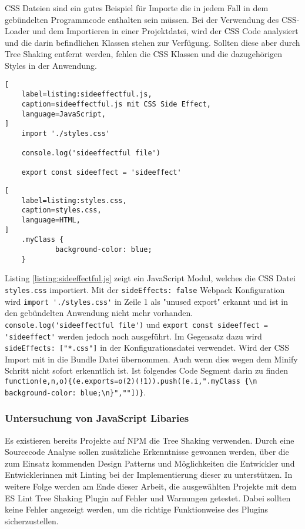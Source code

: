 CSS Dateien sind ein gutes Beispiel für Importe die in jedem Fall in dem gebündelten Programmcode enthalten sein müssen. Bei der Verwendung des CSS-Loader und dem Importieren in einer Projektdatei, wird der CSS Code analysiert und die darin befindlichen Klassen stehen zur Verfügung. Sollten diese aber durch Tree Shaking entfernt werden, fehlen die CSS Klassen und die dazugehörigen Styles in der Anwendung.
\autocite{WebpackTreeShaking}

\begin{lstlisting}[
    label=listing:sideeffectful.js,
	caption=sideeffectful.js mit CSS Side Effect,
	language=JavaScript,
]
	import './styles.css'

	console.log('sideeffectful file')

	export const sideeffect = 'sideeffect'
\end{lstlisting}

\begin{lstlisting}[
    label=listing:styles.css,
	caption=styles.css,
	language=HTML,
]
	.myClass {
    		background-color: blue;
	}
\end{lstlisting}

Listing \ref{listing:sideeffectful.js} zeigt ein JavaScript Modul, welches die CSS Datei \lstinline{styles.css} importiert. Mit der \lstinline{sideEffects: false} Webpack Konfiguration wird \lstinline{import './styles.css'} in Zeile 1 als "unused export" erkannt und ist in den gebündelten Anwendung nicht mehr vorhanden. \lstinline{console.log('sideeffectful file')} und \lstinline{export const sideeffect = 'sideeffect'} werden jedoch noch ausgeführt.
Im Gegensatz dazu wird \lstinline{sideEffects: ["*.css"]} in der Konfigurationsdatei verwendet. Wird der CSS Import mit in die Bundle Datei übernommen. Auch wenn dies wegen dem Minify Schritt nicht sofort erkenntlich ist. Ist folgendes Code Segment darin zu finden \lstinline|function(e,n,o){(e.exports=o(2)(!1)).push([e.i,".myClass {\n    background-color: blue;\n}",""])}|.\autocite{WebpackTreeShaking}

\subsubsection{Untersuchung von JavaScript Libaries}
\label{subsubsection:untersuchung_von_js_libs}
Es existieren bereits Projekte auf NPM die Tree Shaking verwenden. Durch eine Sourcecode Analyse sollen zusätzliche Erkenntnisse gewonnen werden, über die zum Einsatz kommenden Design Patterns und Möglichkeiten die Entwickler und Entwicklerinnen mit Linting bei der Implementierung dieser zu unterstützen.
In weitere Folge werden am Ende dieser Arbeit, die ausgewählten Projekte mit dem ES Lint Tree Shaking Plugin auf Fehler und Warnungen getestet. Dabei sollten keine Fehler angezeigt werden, um die richtige Funktionweise des Plugins sicherzustellen.

